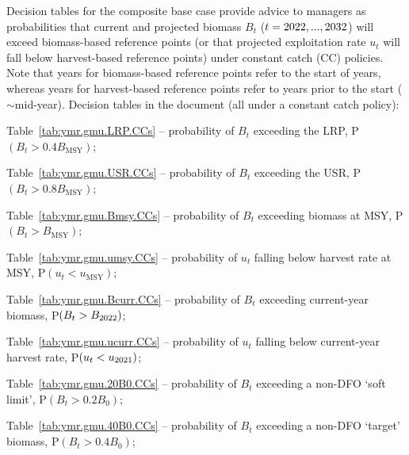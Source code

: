 \documentclass[11pt]{book}
\newcommand{\Bmsy}{B_\mathrm{MSY}}
\newcommand{\umsy}{u_\mathrm{MSY}}
\begin{document}
Decision tables for the composite base case provide advice to managers as probabilities that current and projected biomass $B_t$ ($t = 2022, ..., 2032$) will exceed biomass-based reference points (or that projected exploitation rate $u_t$ will fall below harvest-based reference points) under constant catch (CC) policies. Note that years for biomass-based reference points refer to the start of years, whereas years for harvest-based reference points refer to years prior to the start ($\sim$mid-year).
Decision tables in the document (all under a constant catch policy):
\vspace{-0.5\baselineskip}%
\begin{itemize_csas}
\item Table~\ref{tab:ymr.gmu.LRP.CCs} -- probability of $B_t$ exceeding the LRP, P$(B_t > 0.4 \Bmsy)$; %
\item Table~\ref{tab:ymr.gmu.USR.CCs} -- probability of $B_t$ exceeding the USR, P$(B_t > 0.8 \Bmsy)$; %
\item Table~\ref{tab:ymr.gmu.Bmsy.CCs} -- probability of $B_t$ exceeding biomass at MSY, P$(B_t > \Bmsy)$; %
\item Table~\ref{tab:ymr.gmu.umsy.CCs} -- probability of $u_t$ falling below harvest rate at MSY, P$(u_t < \umsy)$; %
\item Table~\ref{tab:ymr.gmu.Bcurr.CCs} -- probability of $B_t$ exceeding current-year biomass, P$(B_t > B_{2022})$; %
\item Table~\ref{tab:ymr.gmu.ucurr.CCs} -- probability of $u_t$ falling below current-year harvest rate, P$(u_t < u_{2021})$; %
\item Table~\ref{tab:ymr.gmu.20B0.CCs} -- probability of $B_t$ exceeding a non-DFO `soft limit', P$(B_t > 0.2 B_0)$; %
\item Table~\ref{tab:ymr.gmu.40B0.CCs} -- probability of $B_t$ exceeding a non-DFO `target' biomass, P$(B_t > 0.4 B_0)$; %
\end{itemize_csas}
\end{document}
